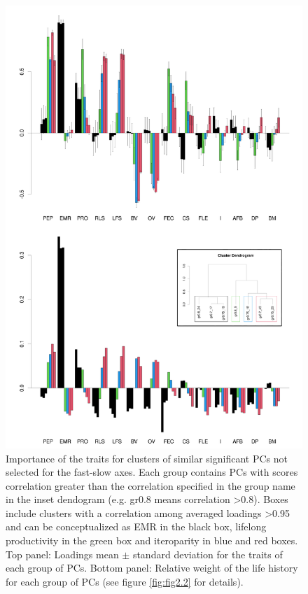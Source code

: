 \begin{figure}
\centering
\includegraphics[width=\textwidth]{./Figures/chapter02/fig3-Secondary axes.png}
\caption[Alternative axes groups and PC loadings]{
Importance of the traits for clusters of similar significant PCs not selected
for the fast-slow axes. Each group contains PCs with scores correlation greater
than the correlation specified in the group name in the inset dendogram (e.g.
gr0.8 means correlation \textgreater{0.8}). Boxes include clusters with a
correlation among averaged loadings \textgreater{0.95} and can be conceptualized
as EMR in the black box, lifelong productivity in the green box and iteroparity
in blue and red boxes. Top panel: Loadings mean $\pm$ standard deviation for the
traits of each group of PCs. Bottom panel: Relative weight of the life history
for each group of PCs (see figure \ref{fig:fig2.2} for details).}
\label{fig:fig2.3}
\end{figure}


